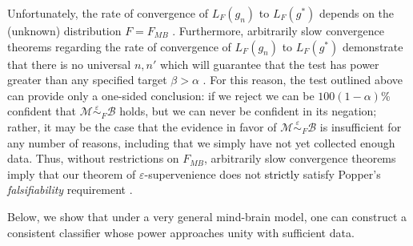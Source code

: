 \documentclass{article}
\newcommand{\mB}{\mathcal{B}}
\newcommand{\mM}{\mathcal{M}}
\newcommand{\MeB}{\mM \overset{\varepsilon}{{\sim}}_{F} \mB}
\providecommand{\tr}[1]{\textcolor{black}{#1}}
\begin{document}



Unfortunately, the rate of convergence of $L_{F}(g_n)$ to $L_{F}(g^*)$ depends on the (unknown) distribution $F=F_{MB}$ \cite{DGL96}. Furthermore, arbitrarily slow convergence theorems regarding the rate of convergence of $L_{F}(g_n)$ to $L_{F}(g^*)$ demonstrate that there is no universal $n,n'$ which will guarantee that the test has power greater than any specified target $\beta > \alpha$ \cite{Devroye83}. For this reason, the test outlined above can provide only a one-sided conclusion: if we reject we can be $100(1-\alpha)$\% confident that $\MeB$ holds, but we can never be confident in its negation; rather, it may be the case that the evidence in favor of $\MeB$ is insufficient for any number of reasons, including that we simply have not yet collected enough data. Thus, without restrictions on $F_{MB}$, arbitrarily slow convergence theorems imply that our theorem of $\varepsilon$-supervenience does not \tr{strictly} satisfy Popper's {\it falsifiability} requirement \cite{Popper}.

Below, we show that under a very general mind-brain model, one can construct a consistent classifier whose power approaches unity with sufficient data.


\end{document}
